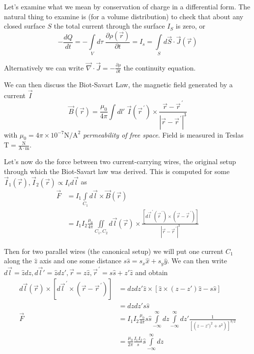 \documentclass[10pt]{report}
\newcommand{\scinot}[2]{#1\times 10^{#2}}
\newcommand{\rd}[2]{\frac{d#1}{d#2}}
\newcommand{\pd}[2]{\frac{\partial #1}{\partial#2}}
\newcommand{\pvec}[1]{\vec{#1}^{\,\prime}}
\newcommand{\abs}[1]{\left|#1\right|}
\begin{document}
Let's examine what we mean by conservation of charge in a differential form. The natural thing to examine is (for a volume distribution) to check that about any closed surface $S$ the total current through the surface $I_S$ is zero, or
\begin{equation}
    -\rd{Q}{t}= -\int\limits_{V}^{}d\tau\;\pd{\rho(\vec{r})}{t} = I_s = \int\limits_{S}^{}d\vec{S}\cdot\vec{J}(\vec{r})
\end{equation}

Alternatively we can write $\vec{\nabla}\cdot\vec{J} = -\pd{\rho}{t}$ the continuity equation.

We can then discuss the Biot-Savart Law, the magnetic field generated by a current $\vec{I}$
\begin{equation}
    \vec{B}(\vec{r}) = \frac{\mu_0}{4\pi}\int\limits_{}^{}dl'\;\vec{I}(\pvec{r}) \times \frac{\vec{r} - \pvec{r}}{\abs{\vec{r} - \pvec{r}}^3}
\end{equation}
with $\mu_0 = \scinot{4\pi}{-7}\mathrm{N/A^2}$ \emph{permeability of free space}. Field is measured in Teslas $\mathrm{T = \frac{N}{A\cdot m}}$.

Let's now do the force between two current-carrying wires, the original setup through which the Biot-Savart law was derived. This is computed for some $\vec{I}_1(\vec{r}), \vec{I}_2(\vec{r}) \propto I_i d\vec{l}$ as
\begin{align}
    \vec{F} &= I_1\int\limits_{C_1}^{}d\vec{l}\times\vec{B}(\vec{r})\\
    &= I_1I_2 \frac{\mu_0}{4\pi}\iint\limits_{C_1, C_2} d\vec{l}(\vec{r}) \times \frac{\left[ d\pvec{l}(\pvec{r}) \times(\vec{r} - \pvec{r}) \right]}{\abs{\vec{r} - \pvec{r}}^3}
\end{align}

Then for two parallel wires (the canonical setup) we will put one current $C_1$ along the $\hat{z}$ axis and one some distance $s\hat{s} = s_x\hat{x} + s_y\hat{y}$. We can then write $d\vec{l} = \hat{z} dz, d\vec{l}' = \hat{z}dz', \vec{r} = z\hat{z}, \pvec{r} = s\hat{s} + z'\hat{z}$ and obtain
\begin{align}
    d\vec{l}(\vec{r}) \times \left[ d\pvec{l} \times(\vec{r} - \pvec{r})\right] &= dzdz'\hat{z}\times\left[ \hat{z}\times\left( z - z' \right)\hat{z} - s\hat{s} \right]\\
    &= dzdz's\hat{s}\\
    \vec{F} &= I_1I_2 \frac{\mu_0}{4\pi}s\hat{s}\int\limits_{-\infty}^{\infty}dz\int\limits_{-\infty}^{\infty}dz'\frac{1}{\left[ \left( z - z')^2 + s^2 \right) \right]^{3/2}}\\
    &= \frac{\mu_0}{2\pi}\frac{I_1I_2}{s}\hat{s}\int\limits_{-\infty}^{\infty}dz
\end{align}
\end{document}

